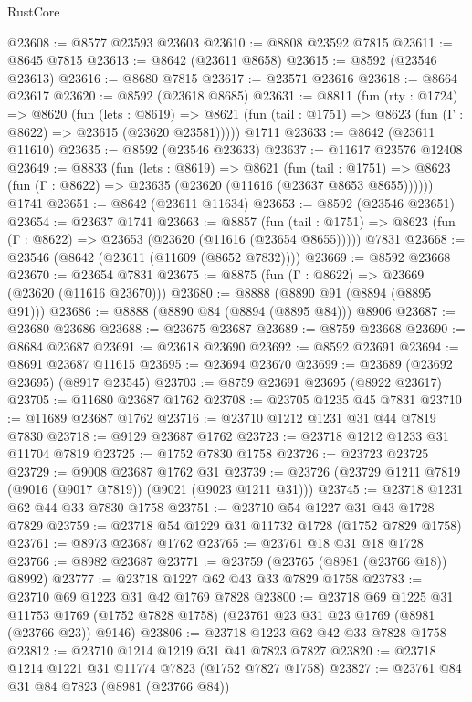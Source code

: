 \begin{lexlean}{RustCore}
\begin{coremodule}
@23608 := @8577 @23593 @23603
@23610 := @8808 @23592 @7815
@23611 := @8645 @7815
@23613 := @8642 (@23611 @8658)
@23615 := @8592 (@23546 @23613)
@23616 := @8680 @7815
@23617 := @23571 @23616
@23618 := @8664 @23617
@23620 := @8592 (@23618 @8685)
@23631 := @8811
    (fun (rty : @1724) =>
    @8620
      (fun (lets : @8619) =>
      @8621 (fun (tail : @1751) => @8623 (fun (Γ : @8622) => @23615 (@23620 @23581)))))
    @1711
@23633 := @8642 (@23611 @11610)
@23635 := @8592 (@23546 @23633)
@23637 := @11617 @23576 @12408
@23649 := @8833
    (fun (lets : @8619) =>
    @8621
      (fun (tail : @1751) =>
      @8623 (fun (Γ : @8622) => @23635 (@23620 (@11616 (@23637 @8653 @8655))))))
    @1741
@23651 := @8642 (@23611 @11634)
@23653 := @8592 (@23546 @23651)
@23654 := @23637 @1741
@23663 := @8857
    (fun (tail : @1751) => @8623 (fun (Γ : @8622) => @23653 (@23620 (@11616 (@23654 @8655)))))
    @7831
@23668 := @23546 (@8642 (@23611 (@11609 (@8652 @7832))))
@23669 := @8592 @23668
@23670 := @23654 @7831
@23675 := @8875 (fun (Γ : @8622) => @23669 (@23620 (@11616 @23670)))
@23680 := @8888 (@8890 @91 (@8894 (@8895 @91)))
@23686 := @8888 (@8890 @84 (@8894 (@8895 @84))) @8906
@23687 := @23680 @23686
@23688 := @23675 @23687
@23689 := @8759 @23668
@23690 := @8684 @23687
@23691 := @23618 @23690
@23692 := @8592 @23691
@23694 := @8691 @23687 @11615
@23695 := @23694 @23670
@23699 := @23689 (@23692 @23695) (@8917 @23545)
@23703 := @8759 @23691 @23695 (@8922 @23617)
@23705 := @11680 @23687 @1762
@23708 := @23705 @1235 @45 @7831
@23710 := @11689 @23687 @1762
@23716 := @23710 @1212 @1231 @31 @44 @7819 @7830
@23718 := @9129 @23687 @1762
@23723 := @23718 @1212 @1233 @31 @11704 @7819
@23725 := @1752 @7830 @1758
@23726 := @23723 @23725
@23729 := @9008 @23687 @1762 @31
@23739 := @23726 (@23729 @1211 @7819 (@9016 (@9017 @7819)) (@9021 (@9023 @1211 @31)))
@23745 := @23718 @1231 @62 @44 @33 @7830 @1758
@23751 := @23710 @54 @1227 @31 @43 @1728 @7829
@23759 := @23718 @54 @1229 @31 @11732 @1728 (@1752 @7829 @1758)
@23761 := @8973 @23687 @1762
@23765 := @23761 @18 @31 @18 @1728
@23766 := @8982 @23687
@23771 := @23759 (@23765 (@8981 (@23766 @18)) @8992)
@23777 := @23718 @1227 @62 @43 @33 @7829 @1758
@23783 := @23710 @69 @1223 @31 @42 @1769 @7828
@23800 := @23718
    @69
    @1225
    @31
    @11753
    @1769
    (@1752 @7828 @1758)
    (@23761 @23 @31 @23 @1769 (@8981 (@23766 @23)) @9146)
@23806 := @23718 @1223 @62 @42 @33 @7828 @1758
@23812 := @23710 @1214 @1219 @31 @41 @7823 @7827
@23820 := @23718 @1214 @1221 @31 @11774 @7823 (@1752 @7827 @1758)
@23827 := @23761 @84 @31 @84 @7823 (@8981 (@23766 @84))

\end{coremodule}
\end{lexlean}
